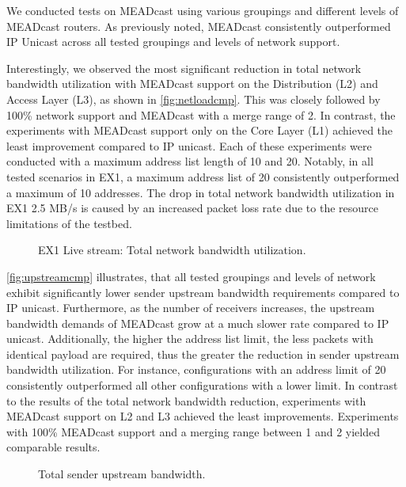 We conducted tests on MEADcast using various groupings and different levels of
    MEADcast routers.
As previously noted, MEADcast consistently outperformed IP Unicast across all
    tested groupings and levels of network support.

Interestingly, we observed the most significant reduction in total network
    bandwidth utilization with MEADcast support on the Distribution (L2) and
    Access Layer (L3), as shown in \autoref{fig:netloadcmp}.
This was closely followed by 100\% network support and MEADcast with a merge 
    range of 2.
In contrast, the experiments with MEADcast support only on the Core Layer (L1)
    achieved the least improvement compared to IP unicast.
Each of these experiments were conducted with a maximum address list length of
    10 and 20.
Notably, in all tested scenarios in EX1, a maximum address list of 20
    consistently outperformed a maximum of 10 addresses.
The drop in total network bandwidth utilization in EX1 2.5 MB/s is caused by
    an increased packet loss rate due to the resource limitations of the
    testbed.

\begin{figure}
    \begin{center}
        
    \end{center}
    \caption[EX1 Live stream: Total network bandwidth utilization]{
        EX1 Live stream: Total network bandwidth utilization.}
    \label{fig:netloadcmp}
\end{figure}

\autoref{fig:upstreamcmp} illustrates, that all tested groupings and levels of
    network exhibit significantly lower sender upstream bandwidth requirements
    compared to IP unicast.
Furthermore, as the number of receivers increases, the upstream bandwidth
    demands of MEADcast grow at a much slower rate compared to IP unicast.
Additionally, the higher the address list limit, the less packets with
    identical payload are required, thus the greater the reduction in sender
    upstream bandwidth utilization.
For instance, configurations with an address limit of 20 consistently
    outperformed all other configurations with a lower limit.
In contrast to the results of the total network bandwidth reduction,
    experiments with MEADcast support on L2 and L3 achieved the least
    improvements.
Experiments with 100\% MEADcast support and a merging range between 1 and 2
    yielded comparable results.

\begin{figure}
    \begin{center}
        
    \end{center}
    \caption[Total sender upstream bandwidth]{Total sender upstream bandwidth.}
    \label{fig:upstreamcmp}
\end{figure}

